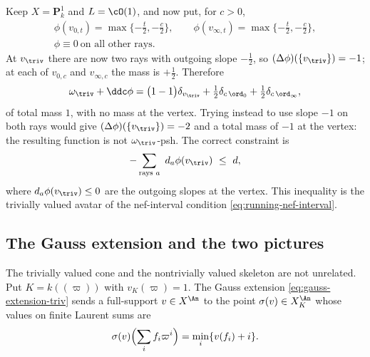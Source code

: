 \begin{example}
\label{ex:ch08-trivial-two-rays}
Keep $X=\mathbf P^1_k$ and $L=\cO(1)$, and now put, for $c>0$,
\[
 \begin{gathered}
 \phi(v_{0,t})=\max\{-\tfrac t2,-\tfrac c2\},\qquad
 \phi(v_{\infty,t})=\max\{-\tfrac t2,-\tfrac c2\},\\
 \phi\equiv0\ \text{on all other rays.}
 \end{gathered}
\]
At $v_\triv$ there are now two rays with outgoing slope $-\tfrac12$, so
$(\Delta\phi)(\{v_\triv\})=-1$; at each of $v_{0,c}$ and $v_{\infty,c}$ the
mass is $+\tfrac12$.  Therefore
\[
 \omega_\triv+\ddc\phi
 =\bigl(1-1\bigr)\delta_{v_\triv}
   +\tfrac12\delta_{c\,\ord_0}+\tfrac12\delta_{c\,\ord_\infty} ,
\]
of total mass $1$, with no mass at the vertex.  Trying instead to use slope
$-1$ on both rays would give
$(\Delta\phi)(\{v_\triv\})=-2$ and a total mass of $-1$ at the vertex: the
resulting function is not $\omega_\triv$-psh.  The correct constraint is
\begin{equation}
\label{eq:ch08-trivial-slope-constraint}
 -\sum_{\text{rays }a}\ d_a\phi(v_\triv)\ \leq\ d ,
\end{equation}
where $d_a\phi(v_\triv)\leq0$ are the outgoing slopes at the vertex.  This
inequality is the trivially valued avatar of the nef-interval condition
\eqref{eq:running-nef-interval}.
\end{example}

\subsection{The Gauss extension and the two pictures}
\label{sec:ch08-gauss-extension}

The trivially valued cone and the nontrivially valued skeleton are not
unrelated.  Put $K=k((\varpi))$ with $v_K(\varpi)=1$.  The Gauss extension
\eqref{eq:gauss-extension-triv} sends a full-support $v\in X^{\An}$ to the
point $\sigma(v)\in X_K^{\An}$ whose values on finite Laurent sums are
\[
 \sigma(v)\Bigl(\sum_if_i\varpi^i\Bigr)=\min_i\{v(f_i)+i\} .
\]

